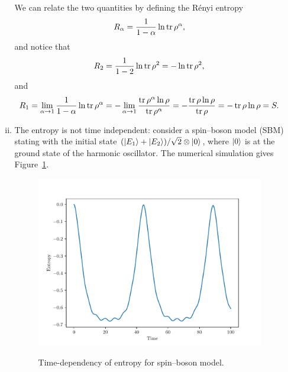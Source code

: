 \documentclass{article}
\begin{document}
\begin{enumerate}[1.]
\begin{enumerate}[(i)]
    We can relate the two quantities by defining the R\'enyi entropy
    \begin{align*}
      R_\alpha = \frac{1}{1-\alpha}\ln \tr\rho^\alpha,
    \end{align*}
    and notice that
    \begin{align*}
      R_2 = \frac{1}{1-2}\ln \tr\rho^2 = -\ln \tr\rho^2,
    \end{align*}
    and
    \begin{align*}
      R_1 = \lim_{\alpha \to 1} \frac{1}{1-\alpha}\ln \tr\rho^\alpha = - \lim_{\alpha \to 1} \frac{ \tr \rho^{\alpha}\ln \rho}{\tr \rho^\alpha} = - \frac{ \tr \rho\ln\rho}{\tr \rho} = -  \tr \rho\ln\rho= S.
    \end{align*}
    \item The entropy is not time independent: consider a spin--boson model (SBM) stating with the initial state $\qty(\ket{E_1} + \ket{E_2})/\sqrt{2}\otimes\ket{0}$, where $\ket{0}$ is at the ground state of the harmonic oscillator. The numerical simulation gives Figure~\ref{fig:q4-ce}.
    \begin{figure}[H]
      \centering
      \includegraphics[width=0.6\linewidth]{q4-ce.pdf}
      \label{fig:q4-ce}
      \caption{Time-dependency of entropy for spin--boson model.}
    \end{figure}
  \end{enumerate}


\end{enumerate}
\end{document}
